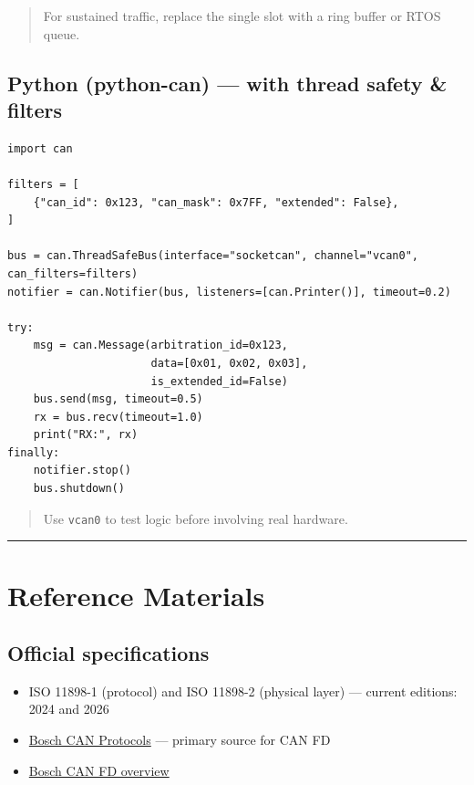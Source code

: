 \documentclass[12pt,a4paper,oneside]{report}
\providecommand{\tightlist}{\setlength{\itemsep}{0pt}\setlength{\parskip}{0pt}}
\begin{document}
\begin{quote}
For sustained traffic, replace the single slot with a ring buffer or RTOS queue.
\end{quote}

\subsection{Python (python-can) --- with thread safety \&
filters}\label{python-python-can-with-thread-safety-filters}

\begin{verbatim}
import can

filters = [
    {"can_id": 0x123, "can_mask": 0x7FF, "extended": False},
]

bus = can.ThreadSafeBus(interface="socketcan", channel="vcan0", can_filters=filters)
notifier = can.Notifier(bus, listeners=[can.Printer()], timeout=0.2)

try:
    msg = can.Message(arbitration_id=0x123,
                      data=[0x01, 0x02, 0x03],
                      is_extended_id=False)
    bus.send(msg, timeout=0.5)
    rx = bus.recv(timeout=1.0)
    print("RX:", rx)
finally:
    notifier.stop()
    bus.shutdown()
\end{verbatim}

\begin{quote}
Use \texttt{vcan0} to test logic before involving real hardware.
\end{quote}

\begin{center}\rule{0.5\linewidth}{0.5pt}\end{center}

\section{Reference Materials}\label{reference-materials}

\subsection{Official specifications}\label{official-specifications}

\begin{itemize}
\tightlist
\item
  ISO 11898-1 (protocol) and ISO 11898-2 (physical layer) --- current editions:
  2024 and 2026
\item
  \href{https://www.bosch-semiconductors.com/ip-modules/can-protocols/}{Bosch
  CAN Protocols} --- primary source for CAN FD
\item
  \href{https://www.bosch-semiconductors.com/ip-modules/can-fd-ip-modules/can-fd/}{Bosch
  CAN FD overview}
\end{itemize}
\end{document}
